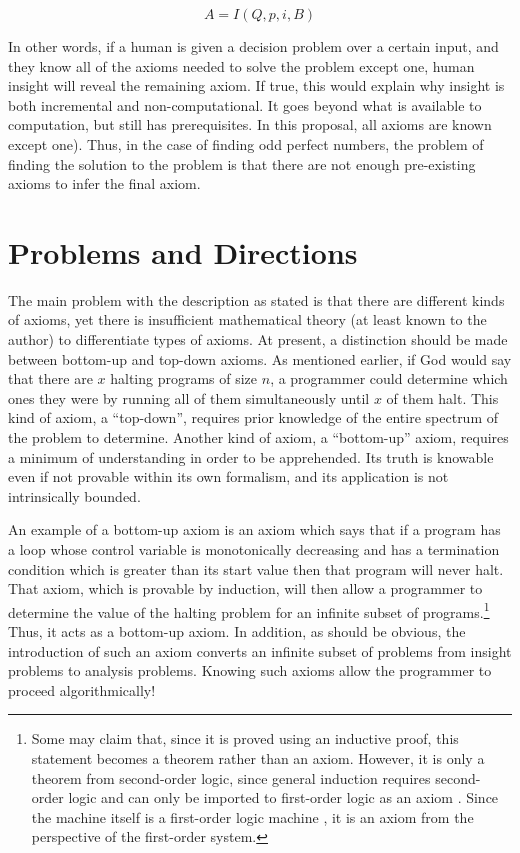 \begin{equation}
A = I(Q, p, i, B)
\end{equation}

In other words, if a human is given a decision problem over a certain input, and they know all of the axioms needed to solve the problem except one, human insight will reveal the remaining axiom.  If true, this would explain why insight is both incremental and non-computational.  It goes beyond what is available to computation, but still has prerequisites. In this proposal, all axioms are known except one).  Thus, in the case of finding odd perfect numbers, the problem of finding the solution to the problem is that there are not enough pre-existing axioms to infer the final axiom.

\section{Problems and Directions}

The main problem with the description as stated is that there are different kinds of axioms, yet there is insufficient mathematical theory (at least known to the author) to differentiate types of axioms.  At present, a distinction should be made between bottom-up and top-down axioms.  As mentioned earlier, if God would say that there are $x$ halting programs of size $n$, a programmer could determine which ones they were by running all of them simultaneously until $x$ of them halt.  This kind of axiom, a ``top-down'', requires prior knowledge of the entire spectrum of the problem to determine.  Another kind of axiom, a ``bottom-up'' axiom, requires a minimum of understanding in order to be apprehended. Its truth is knowable even if not provable within its own formalism, and its application is not intrinsically bounded.  

An example of a bottom-up axiom is an axiom which says that if a program has a loop whose control variable is monotonically decreasing and has a termination condition which is greater than its start value then that program will never halt.  That axiom, which is provable by induction, will then allow a programmer to determine the value of the halting problem for an infinite subset of programs.\footnote{Some may claim that, since it is proved using an inductive proof, this statement becomes a theorem rather than an axiom.  However, it is only a theorem from second-order logic, since general induction requires second-order logic and can only be imported to first-order logic as an axiom \citep{enderton2012}.  Since the machine itself is a first-order logic machine \citep{turing1936}, it is an axiom from the perspective of the first-order system.}  Thus, it acts as a bottom-up axiom.  In addition, as should be obvious, the introduction of such an axiom converts an infinite subset of problems from insight problems to analysis problems.  Knowing such axioms allow the programmer to proceed algorithmically!

